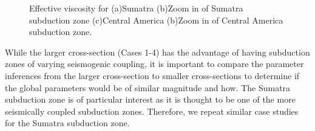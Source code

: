 \documentclass[12pt]{article}
\begin{document}
\begin{figure}[H]
\centering

\hspace{-1.0cm}

\hspace{0.2cm}
\caption{Effective viscosity for (a)Sumatra (b)Zoom in of Sumatra subduction zone (c)Central America (b)Zoom in of Central America subduction zone.}
\label{fig:visc_smaller}
\end{figure}

While the larger cross-section (Cases 1-4) has the advantage of having subduction zones of varying seismogenic coupling, it is important to compare the parameter inferences from the larger cross-section to smaller cross-sections to determine if the global parameters would be of similar magnitude and how. The Sumatra subduction zone is of particular interest as it is thought to be one of the more seismically coupled subduction zones. Therefore, we repeat similar case studies for the Sumatra subduction zone.
\end{document}
